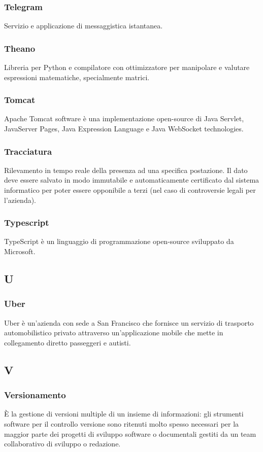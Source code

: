 \subsubsection*{Telegram} Servizio e applicazione di messaggistica istantanea.
\subsubsection*{Theano} Libreria per Python e compilatore con ottimizzatore per manipolare e valutare espressioni matematiche, specialmente matrici.
\subsubsection*{Tomcat} Apache Tomcat software è una implementazione open-source di Java Servlet, JavaServer Pages, Java Expression Language e Java WebSocket technologies.
\subsubsection*{Tracciatura} Rilevamento in tempo reale della presenza ad una specifica
postazione. Il dato deve essere salvato in modo immutabile e automaticamente certificato dal
sistema informatico per poter essere opponibile a terzi (nel caso di controversie legali per l’azienda).
\subsubsection*{Typescript} TypeScript è un linguaggio di programmazione open-source sviluppato da Microsoft.
\subsection*{U}
\subsubsection*{Uber} Uber è un'azienda con sede a San Francisco che fornisce un servizio di trasporto automobilistico privato attraverso un'applicazione mobile che mette in collegamento diretto passeggeri e autisti.
\subsection*{V}
\subsubsection*{Versionamento} È la gestione di versioni multiple di un insieme di informazioni: gli strumenti software per il controllo versione sono ritenuti molto spesso necessari per la maggior parte dei progetti di sviluppo software o documentali gestiti da un team collaborativo di sviluppo o redazione.
